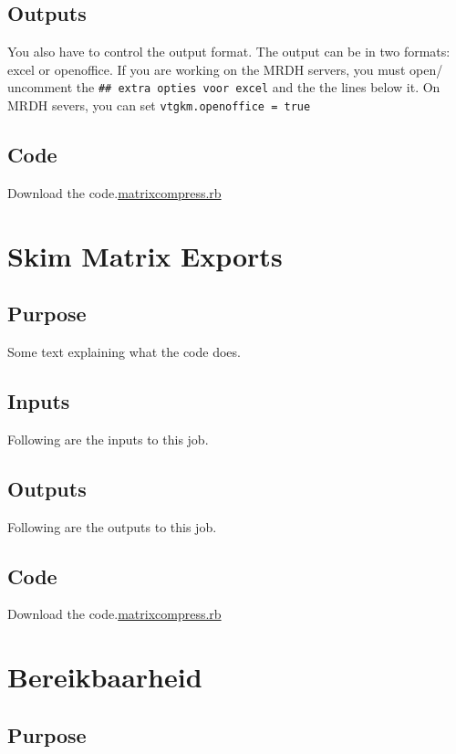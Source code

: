 \documentclass[
  letterpaper,
  DIV=11,
  numbers=noendperiod]{scrreprt}
\begin{document}
\section{Outputs}

You also have to control the output format. The output can be in two
formats: excel or openoffice. If you are working on the MRDH servers,
you must open/ uncomment the \texttt{\#\#\ extra\ opties\ voor\ excel}
and the the lines below it. On MRDH severs, you can set
\texttt{vtgkm.openoffice\ =\ true}

\section{Code}

Download the code.\href{../first.rb}{matrixcompress.rb}

\chapter{Skim Matrix Exports}\label{skim-matrix-exports}

\section{Purpose}

Some text explaining what the code does.

\section{Inputs}

Following are the inputs to this job.

\section{Outputs}

Following are the outputs to this job.

\section{Code}

Download the code.\href{../first.rb}{matrixcompress.rb}

\chapter{Bereikbaarheid}\label{bereikbaarheid}

\section{Purpose}
\end{document}
